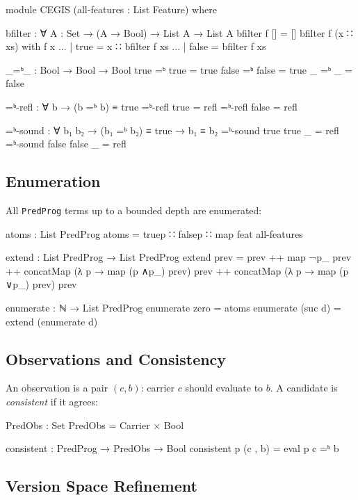 \documentclass[9pt,a4paper]{article}
\theoremstyle{plain}
\theoremstyle{definition}
\theoremstyle{remark}
\begin{document}
\begin{code}
  module CEGIS
    (all-features : List Feature)
    where

    bfilter : ∀ {A : Set} → (A → Bool) → List A → List A
    bfilter f []       = []
    bfilter f (x ∷ xs) with f x
    ... | true  = x ∷ bfilter f xs
    ... | false = bfilter f xs

    _=ᵇ_ : Bool → Bool → Bool
    true  =ᵇ true  = true
    false =ᵇ false = true
    _     =ᵇ _     = false

    =ᵇ-refl : ∀ b → (b =ᵇ b) ≡ true
    =ᵇ-refl true  = refl
    =ᵇ-refl false = refl

    =ᵇ-sound : ∀ b₁ b₂ → (b₁ =ᵇ b₂) ≡ true → b₁ ≡ b₂
    =ᵇ-sound true  true  _ = refl
    =ᵇ-sound false false _ = refl
\end{code}

\subsection{Enumeration}

All \texttt{PredProg} terms up to a bounded depth are enumerated:

\begin{code}
    atoms : List PredProg
    atoms = truep ∷ falsep ∷ map feat all-features

    extend : List PredProg → List PredProg
    extend prev =
      prev
      ++ map ¬p_ prev
      ++ concatMap (λ p → map (p ∧p_) prev) prev
      ++ concatMap (λ p → map (p ∨p_) prev) prev

    enumerate : ℕ → List PredProg
    enumerate zero    = atoms
    enumerate (suc d) = extend (enumerate d)
\end{code}

\subsection{Observations and Consistency}

An observation is a pair $(c, b)$: carrier $c$ should evaluate to $b$.  A candidate is \emph{consistent} if it agrees:

\begin{code}
    PredObs : Set
    PredObs = Carrier × Bool

    consistent : PredProg → PredObs → Bool
    consistent p (c , b) = eval p c =ᵇ b
\end{code}

\subsection{Version Space Refinement}
\end{document}
